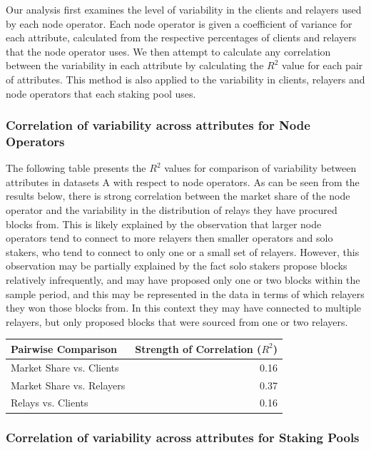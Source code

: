\documentclass[conference]{IEEEtran}
\begin{document}
Our analysis first examines the level of variability in the clients and relayers used by each node operator.  Each node operator is given a coefficient of variance for each attribute, calculated from the respective percentages of clients and relayers that the node operator uses. We then attempt to calculate any correlation between the variability in each attribute by calculating the $R^2$ value for each pair of attributes.  This method is also applied to the variability in clients, relayers and node operators that each staking pool uses.

\subsubsection{Correlation of variability across attributes for Node Operators}

The following table presents the $R^2$ values for comparison of variability between attributes in datasets A with respect to node operators. As can be seen from the results below, there is strong correlation between the market share of the node operator and the variability in the distribution of relays they have procured blocks from. This is likely explained by the observation that larger node operators tend to connect to more relayers then smaller operators and solo stakers, who tend to connect to only one or a small set of relayers.  However, this observation may be partially explained by the fact solo stakers propose blocks relatively infrequently, and may have proposed only one or two blocks within the sample period, and this may be represented in the data in terms of which relayers they won those blocks from.  In this context they may have connected to multiple relayers, but only proposed blocks that were sourced from one or two relayers.

\begin{table}[htbp]
    \centering
    \normalsize
    \begin{tabular}{p{3.9cm}r}
        \toprule
        Pairwise Comparison & Strength of Correlation ($R^2$) \\
        \midrule
        Market Share vs. Clients & 0.16 \\
        Market Share vs. Relayers & 0.37 \\
        Relays vs. Clients & 0.16 \\
        \bottomrule
    \end{tabular}
\end{table}

\subsubsection{Correlation of variability across attributes for Staking Pools}
\end{document}
